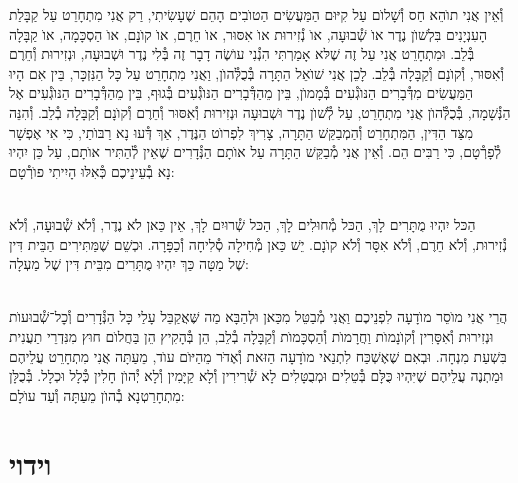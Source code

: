 \documentclass[twoside, openany, parskip=half, 11pt]{book}
\begin{document}
וְ֯אֵין אֲנִי תוׂהֵא חַס וְ֯שָׁלוׂם עַל קִיּוּם הַמַּעֲשִׂים הַטוׂבִים הָהֵם שֶׁעָשִׂיתִי, רַק אֲנִי מִתְחָרֵט עַל קַבָּלַת הָעִנְיָנִים בִּלְשׁוׂן נֶדֶר אוׂ שְׁ֯בוּעָה, אוׂ נְ֯זִירוּת אוׂ אִסּוּר, אוׂ חֵרֶם, אוׂ קוׂנָם, אוׂ הַסְכָּמָה, אוׂ קַבָּלָה בְּ֯לֵב. וּמִתְחָרֵט אֲנִי עַל זֶה שֶׁלּא אָמַרְתִּי הִנְ֯נִי עוׂשֶׂה דָבָר זֶה בְּ֯לִי נֶדֶר וּשְׁבוּעָה, וּנְזִירוּת וְ֯חֵרֶם וְ֯אִסּוּר, וְ֯קוׂנָם וְ֯קַבָּלָה בְּ֯לֵב. לָכֵן אֲנִי שׁוׂאֵל הַתָּרָה בְּ֯כֻלְּ֯הוׂן, וַאֲנִי מִתְחָרֵט עַל כָּל הַנִּזְכָּר, בֵּין אִם הָיוּ הַמַּעֲשִׂים מִדְּ֯בָרִים הַנּוׂגְ֯עִים בְּ֯מָמוׂן, בֵּין מֵהַדְּ֯בָרִים הַנּוׂגְ֯עִים בְּ֯גוּף, בֵּין מֵהַדְּ֯בָרִים הַנּוׂגְ֯עִים אֶל הַנְּ֯שָׁמָה, בְּ֯כֻלְּ֯הוׂן אֲנִי מִתְחָרֵט, עַל לְ֯שׁוׂן נֶדֶר וּשְׁבוּעָה וּנְזִירוּת וְ֯אִסּוּר וְ֯חֵרֶם וְ֯קוׂנָם וְ֯קַבָּלָה בְ֯לֵב. וְ֯הִנֵּה מִצַּד הַדִּין, הַמִּתְחָרֵט וְ֯הַמְבַקֵּשׁ הַתָּרָה, צָרִיךְ לִפְרוׂט הַנֶּדֶר, אַךְ דְּ֯עוּ נָא רַבּוׂתַי, כִּי אִי אֶפְשָׁר לְ֯פָרְ֯טָם, כִּי רַבִּים הֵם. וְ֯אֵין אֲנִי מְ֯בַקֵּשׁ הַתָּרָה עַל אוׂתָם הַנְּ֯דָרִים שֶׁאֵין לְ֯הַתִּיר אוׂתָם, עַל כֵּן יִהְיוּ נָא בְ֯עֵינֵיכֶם כְּ֯אִלּוּ הָיִיתִי פוׂרְ֯טָם:

\\
הַכּל יִהְיוּ מֻתָּרִים לָךְ, הַכּל מְ֯חוּלִים לָךְ, הַכּל שְׁ֯רוּיִם לָךְ, אֵין כַּאן לֺא נֶדֶר, וְ֯לֺא שְׁ֯בוּעָה, וְ֯לֺא נְ֯זִירוּת, וְ֯לֺא חֵרֶם, וְ֯לֺא אִסָּר וְ֯לֺא קוׂנָם. יֵשׁ כַּאן מְ֯חִילָה סְ֯לִיחָה וְ֯כַפָּרָה. וּכְשֵׁם שֶׁמַּתִּירִים הַבֵּית דִּין שֶׁל מַטָּה כַּךְ יִהְיוּ מֻתָּרִים מִבֵּית דִּין שֶׁל מַעְלָה:

\\
הֲרֵי אֲנִי מוֺסֵר מוׂדָעָה לִפְנֵיכֶם וַאֲנִי מְ֯בַטֵּל מִכַּאן וּלְהַבָּא מַה שֶּׁאֲקַבֵּל עָלַי כָּל הַנְּ֯דָרִים וְ֯כׇל־שְׁ֯בוּעוׂת וּנְזִירוּת וְ֯אִסָּרִין וְ֯קוׂנָמוׂת וַחֲרָמוׂת וְ֯הַסְכָּמוׂת וְ֯קַבָּלָה בְ֯לֵב, הֵן בְּ֯הָקִיץ הֵן בַּחֲלוׂם חוּץ מִנִּדְרֵי תַעֲנִית בִּשְׁעַת מִנְחָה. וּבְאִם שֶׁאֶשְׁכַּח לִתְנַאי מוׂדָעָה הַזּאת וְ֯אֶדּׂר מֵהַיּוׂם עוׂד, מֵעַתָּה אֲנִי מִתְחָרֵט עֲלֵיהֶם וּמַתְנֶה עֲלֵיהֶם שֶׁיִּהְיוּ כֻּלָּם בְּ֯טֵלִים וּמְבֻטָּלִים לָא שְׁ֯רִירִין וְ֯לָא קַיָּמִין וְ֯לָא יְ֯הוׂן חָלִין כְּ֯לָל וּכְלָל. בְּ֯כֻלָּן מִתְחָרַטְנָא בְ֯הוׂן מֵעַתָּה וְ֯עַד עוׂלָם:

\vfill
\sepline




\chapter[וידוי]{ וידוי }
\end{document}
